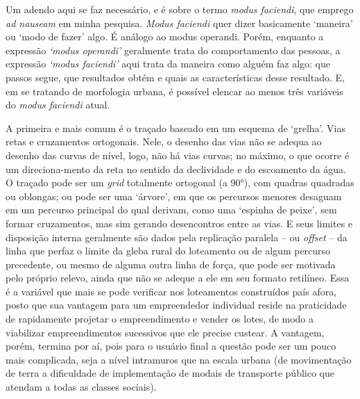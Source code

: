 \documentclass[twoside, 12pt]{book}
\begin{document}
        Um adendo aqui se faz necessário, e é sobre o termo \textit{modus faciendi}, que emprego \textit{ad nauseam} em minha pesquisa. \textit{Modus faciendi} quer dizer basicamente ‘maneira’ ou ‘modo de fazer’ algo. É análogo ao modus operandi. Porém, enquanto a expressão \textit{‘modus operandi’} geralmente trata do comportamento das pessoas, a expressão \textit{‘modus faciendi’} aqui trata da maneira como alguém faz algo: que passos segue, que resultados obtém e quais as características desse resultado. E, em se tratando de morfologia urbana, é possível elencar ao menos três variáveis do \textit{modus faciendi} atual.

        A primeira e mais comum é o traçado baseado em um esquema de ‘grelha’. Vias retas e cruzamentos ortogonais. Nele, o desenho das vias não se adequa ao desenho das curvas de nível, logo, não há vias curvas; no máximo, o que ocorre é um direciona-mento da reta no sentido da declividade e do escoamento da água. O traçado pode ser um \textit{grid} totalmente ortogonal (a 90°), com quadras quadradas ou oblongas; ou pode ser uma ‘árvore’, em que os percursos menores desaguam em um percurso principal do qual derivam, como uma ‘espinha de peixe’, sem formar cruzamentos, mas sim gerando desencontros entre as vias. E seus limites e disposição interna geralmente são dados pela replicação paralela – ou \textit{offset} – da linha que perfaz o limite da gleba rural do loteamento ou de algum percurso precedente, ou mesmo de alguma outra linha de força, que pode ser motivada pelo próprio relevo, ainda que não se adeque a ele em seu formato retilíneo. Essa é a variável que mais se pode verificar nos loteamentos construídos país afora, posto que sua vantagem para um empreendedor individual reside na praticidade de rapidamente projetar o empreendimento e vender os lotes, de modo a viabilizar empreendimentos sucessivos que ele precise custear. A vantagem, porém, termina por aí, pois para o usuário final a questão pode ser um pouco mais complicada, seja a nível intramuros que na escala urbana (de movimentação de terra a dificuldade de implementação de modais de transporte público que atendam a todas as classes sociais).
\end{document}
